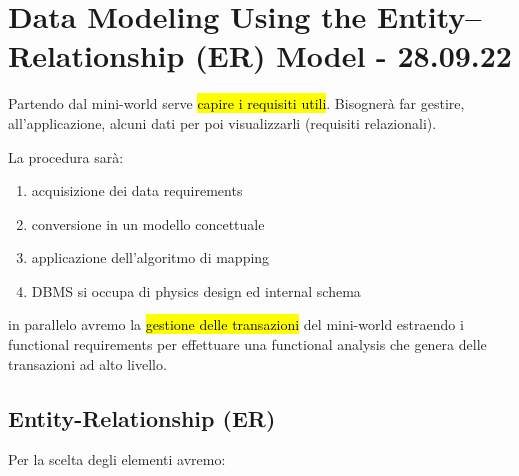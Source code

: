 \newpage
\section{Data Modeling Using the Entity–Relationship (ER) Model - 28.09.22}

Partendo dal mini-world serve \hl{capire i requisiti utili}. Bisognerà far gestire, all'applicazione, alcuni dati per poi visualizzarli (requisiti relazionali).

La procedura sarà:

\begin{enumerate}
	\item acquisizione dei data requirements
	\item conversione in un modello concettuale
	\item applicazione dell'algoritmo di mapping
	\item DBMS si occupa di physics design ed internal schema
\end{enumerate}

in parallelo avremo la \hl{gestione delle transazioni} del mini-world estraendo i functional requirements per effettuare una functional analysis che genera delle transazioni ad alto livello.


\subsection{Entity-Relationship (ER)}

Per la scelta degli elementi avremo:


